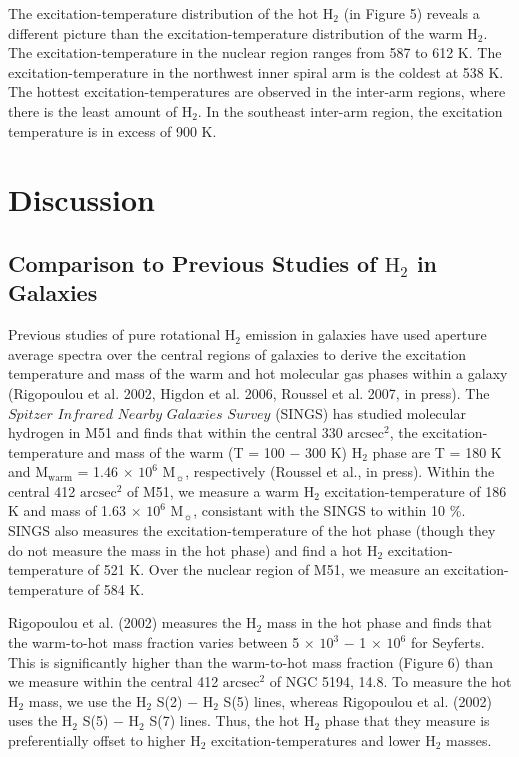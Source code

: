 \documentclass[manuscript]{aastex}
\begin{document}
The excitation-temperature distribution of the hot $\mathrm{H_2}$ (in Figure 5) reveals a different picture than the excitation-temperature distribution of the warm $\mathrm{H_2}$.  The excitation-temperature in the nuclear region ranges from 587 to 612 K.  The excitation-temperature in the northwest inner spiral arm is the coldest at 538 K.  The hottest excitation-temperatures are observed in the inter-arm regions, where there is the least amount of $\mathrm{H_2}$.  In the southeast inter-arm region, the excitation temperature is in excess of 900 K.

\section{Discussion}

\subsection{Comparison to Previous Studies of $\mathrm{H_2}$ in Galaxies}

Previous studies of pure rotational $\mathrm{H_2}$ emission in galaxies have used aperture average spectra over the central regions of galaxies to derive the excitation temperature and mass of the warm and hot molecular gas phases within a galaxy (Rigopoulou et al. 2002, Higdon et al. 2006, Roussel et al. 2007, in press).  The $Spitzer$ $Infrared$ $Nearby$ $Galaxies$ $Survey$ (SINGS) has studied molecular hydrogen in M51 and finds that within the central 330 $\mathrm{arcsec^2}$, the excitation-temperature and mass of the warm (T = 100 $-$ 300 K) $\mathrm{H_2}$ phase are T = 180 K and $\mathrm{M_{warm}}$ = 1.46 $\times$ $\mathrm{10^6}$ $\mathrm{M_\sun}$, respectively (Roussel et al., in press).  Within the central 
412 $\mathrm{arcsec^2}$ of M51, we measure a warm $\mathrm{H_2}$ excitation-temperature of 186 K and mass of 1.63 $\times$ $\mathrm{10^6}$ $\mathrm{M_\sun}$, consistant with the SINGS to within 10 \%.  SINGS also measures the excitation-temperature of the hot phase (though they do not measure the mass in the hot phase) and find a hot $\mathrm{H_2}$ excitation-temperature of 521 K.  Over the nuclear region of M51, we measure an excitation-temperature of 584 K.  

Rigopoulou et al. (2002) measures the $\mathrm{H_2}$ mass in the hot phase and finds that the warm-to-hot mass fraction varies between 5 $\times$ $\mathrm{10^3}$ $-$ 1 $\times$ $\mathrm{10^6}$ for Seyferts.  This is significantly higher than the warm-to-hot mass fraction (Figure 6) than we measure within the central 412 $\mathrm{arcsec^2}$ of NGC 5194, 14.8.  To measure the hot $\mathrm{H_2}$ mass, we use the $\mathrm{H_2}$ S(2) $-$ $\mathrm{H_2}$ S(5) lines, whereas Rigopoulou et al. (2002) uses the $\mathrm{H_2}$ S(5) $-$ $\mathrm{H_2}$ S(7) lines.  Thus, the hot $\mathrm{H_2}$ phase that they measure is preferentially offset to higher $\mathrm{H_2}$ excitation-temperatures and lower $\mathrm{H_2}$ masses.  
\end{document}

